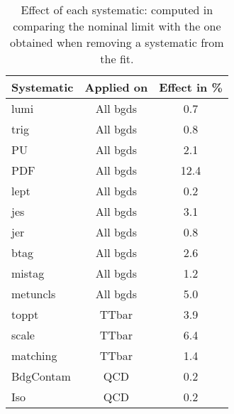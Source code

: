 \documentclass[10pt]{article}
\begin{document}
\begin{table}[!ht]
\begin{center}
\begin{tabular}{|l|c|c|}
\hline
\hline
\hline
\textbf{Systematic} & \textbf{Applied on} & \textbf{Effect in \%}\\
\hline
lumi            & All bgds  & 0.7   \\
trig            & All bgds  & 0.8   \\
PU              & All bgds  & 2.1   \\
PDF             & All bgds  & 12.4   \\
lept            & All bgds  & 0.2   \\
jes             & All bgds  & 3.1   \\
jer             & All bgds  & 0.8   \\
btag            & All bgds  & 2.6   \\
mistag          & All bgds  & 1.2   \\
metuncls        & All bgds  & 5.0   \\
toppt           & TTbar     & 3.9   \\
scale           & TTbar     & 6.4   \\
matching        & TTbar     & 1.4   \\
BdgContam       & QCD       & 0.2   \\
Iso             & QCD       & 0.2   \\
\hline
\hline

\hline
\hline
\end{tabular}
\caption{Effect of each systematic: computed in comparing the nominal limit with the one obtained when removing a systematic from the fit.}
\label{tab:SFtable}
\end{center}
\end{table} 
\end{document}
